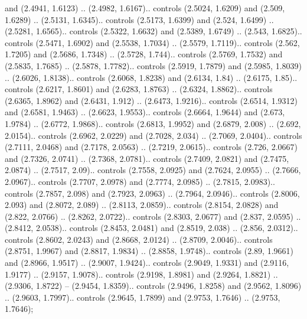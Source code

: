 and (2.4941, 1.6123) .. (2.4982, 1.6167).. controls (2.5024, 1.6209) and (2.509, 1.6289) .. (2.5131, 1.6345).. controls (2.5173, 1.6399) and (2.524, 1.6499) .. (2.5281, 1.6565).. controls (2.5322, 1.6632) and (2.5389, 1.6749) .. (2.543, 1.6825).. controls (2.5471, 1.6902) and (2.5538, 1.7034) .. (2.5579, 1.7119).. controls (2.562, 1.7205) and (2.5686, 1.7348) .. (2.5728, 1.744).. controls (2.5769, 1.7532) and (2.5835, 1.7685) .. (2.5878, 1.7782).. controls (2.5919, 1.7879) and (2.5985, 1.8039) .. (2.6026, 1.8138).. controls (2.6068, 1.8238) and (2.6134, 1.84) .. (2.6175, 1.85).. controls (2.6217, 1.8601) and (2.6283, 1.8763) .. (2.6324, 1.8862).. controls (2.6365, 1.8962) and (2.6431, 1.912) .. (2.6473, 1.9216).. controls (2.6514, 1.9312) and (2.6581, 1.9463) .. (2.6623, 1.9553).. controls (2.6664, 1.9644) and (2.673, 1.9784) .. (2.6772, 1.9868).. controls (2.6813, 1.9952) and (2.6879, 2.008) .. (2.692, 2.0154).. controls (2.6962, 2.0229) and (2.7028, 2.034) .. (2.7069, 2.0404).. controls (2.7111, 2.0468) and (2.7178, 2.0563) .. (2.7219, 2.0615).. controls (2.726, 2.0667) and (2.7326, 2.0741) .. (2.7368, 2.0781).. controls (2.7409, 2.0821) and (2.7475, 2.0874) .. (2.7517, 2.09).. controls (2.7558, 2.0925) and (2.7624, 2.0955) .. (2.7666, 2.0967).. controls (2.7707, 2.0978) and (2.7774, 2.0985) .. (2.7815, 2.0983).. controls (2.7857, 2.098) and (2.7923, 2.0963) .. (2.7964, 2.0946).. controls (2.8006, 2.093) and (2.8072, 2.089) .. (2.8113, 2.0859).. controls (2.8154, 2.0828) and (2.822, 2.0766) .. (2.8262, 2.0722).. controls (2.8303, 2.0677) and (2.837, 2.0595) .. (2.8412, 2.0538).. controls (2.8453, 2.0481) and (2.8519, 2.038) .. (2.856, 2.0312).. controls (2.8602, 2.0243) and (2.8668, 2.0124) .. (2.8709, 2.0046).. controls (2.8751, 1.9967) and (2.8817, 1.9834) .. (2.8858, 1.9748).. controls (2.89, 1.9661) and (2.8966, 1.9517) .. (2.9007, 1.9424).. controls (2.9049, 1.9331) and (2.9116, 1.9177) .. (2.9157, 1.9078).. controls (2.9198, 1.8981) and (2.9264, 1.8821) .. (2.9306, 1.8722) -- (2.9454, 1.8359).. controls (2.9496, 1.8258) and (2.9562, 1.8096) .. (2.9603, 1.7997).. controls (2.9645, 1.7899) and (2.9753, 1.7646) .. (2.9753, 1.7646);



